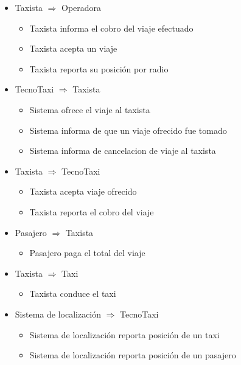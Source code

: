 \begin{itemize}
\begin{itemize}
        \end{itemize}

        \item Taxista $\Rightarrow$ Operadora
  	 	 \begin{itemize}
        \item Taxista informa el cobro del viaje efectuado
        \item Taxista acepta un viaje
        \item Taxista reporta su posici\'on por radio
        
        \end{itemize}


    \item TecnoTaxi $\Rightarrow$ Taxista
    \begin{itemize}
        \item Sistema ofrece el viaje al taxista
        \item Sistema informa de que un viaje ofrecido fue tomado
        \item Sistema informa de cancelacion de viaje al taxista
    \end{itemize}

    \item Taxista $\Rightarrow$ TecnoTaxi
    \begin{itemize}
         \item Taxista acepta viaje ofrecido
         \item Taxista reporta el cobro del viaje
     \end{itemize}

         \item Pasajero $\Rightarrow$ Taxista
    \begin{itemize}
         \item Pasajero paga el total del viaje
    \end{itemize}

   \item Taxista $\Rightarrow$ Taxi 
    \begin{itemize}
         \item Taxista conduce el taxi
    \end{itemize}


    \item Sistema de localizaci\'on $\Rightarrow$ TecnoTaxi
    \begin{itemize}
        \item Sistema de localizaci\'on reporta posici\'on de un taxi
        \item Sistema de localizaci\'on reporta posici\'on de un pasajero
        

\end{itemize}
\end{itemize}
